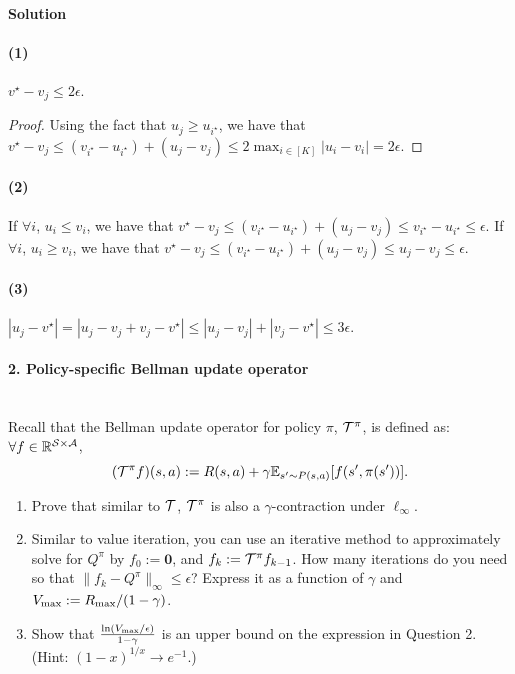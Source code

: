 \documentclass{article}
\begin{document}
\paragraph{Solution}
\paragraph{(1)} $v^\star - v_j \leq 2\epsilon$.
\begin{proof} Using the fact that $u_j \geq u_{i^\star}$, we have that\\ $v^\star - v_j \leq (v_{i^\star} - u_{i^\star}) + (u_j - v_j) \leq 2 \max_{i \in [K]} |u_i - v_i| = 2 \epsilon$.
\end{proof}
\paragraph{(2)} If $\forall i$, $u_i \leq v_{i}$, we have that $v^\star - v_j \leq (v_{i^\star} - u_{i^\star}) + (u_j - v_j) \leq v_{i^\star} - u_{i^\star} \leq \epsilon$. If $\forall i$, $u_i \geq v_{i}$, we have that $v^\star - v_j \leq (v_{i^\star} - u_{i^\star}) + (u_j - v_j) \leq u_j - v_j \leq \epsilon$.
\paragraph{(3)} $|u_j - v^\star| = |u_j - v_j + v_j -v^\star| \leq |u_j - v_j| + |v_j - v^\star| \leq 3\epsilon$.
\newpage

\paragraph{2. Policy-specific Bellman update operator}~\\
Recall that the Bellman update operator for policy $\pi$, $\mathcal{T}^\pi$, is defined as: $\forall f\in \mathbb{R}^{\mathcal{S}\times\mathcal{A}}$,
$$
(\mathcal{T}^\pi f)(s,a) := R(s,a) + \gamma \mathbb{E}_{s'\sim P(s,a)}[f(s', \pi(s'))].
$$
\begin{enumerate}
\item Prove that similar to $\mathcal{T}$, $\mathcal{T}^\pi$ is also a $\gamma$-contraction under $\ell_\infty$.
\item Similar to value iteration, you can use an iterative method to approximately solve for $Q^\pi$ by  $f_0 := \mathbf{0}$, and $f_k := \mathcal{T}^\pi f_{k-1}$. How many iterations do you need so that $\|f_k - Q^\pi\|_\infty \le \epsilon$? Express it as a function of $\gamma$ and $V_{\max} := R_{\max}/(1-\gamma)$.
\item Show that $\frac{\ln(V_{\max}/\epsilon)}{1-\gamma}$ is an upper bound on the expression in Question 2. (Hint: $(1-x)^{1/x} \to e^{-1}$.)
\end{enumerate}
\end{document}
